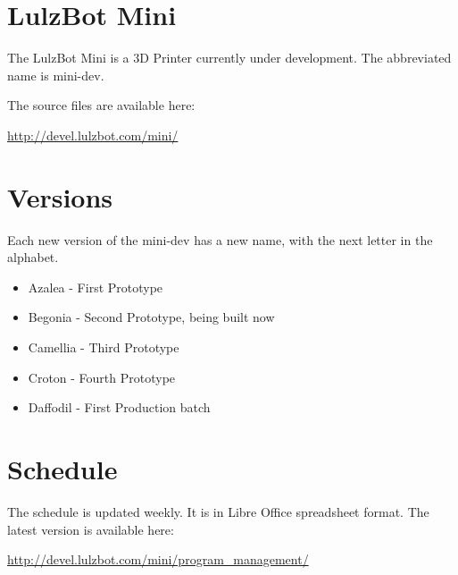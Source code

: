 %
%
%
%
%

\section{LulzBot Mini}
The LulzBot Mini is a 3D Printer currently under development. The
abbreviated name is mini-dev.

The source files are available here:

\href{http://devel.lulzbot.com/mini/}{http://devel.lulzbot.com/mini/}

\section{Versions}
Each new version of the mini-dev has a new name, with the next letter in the alphabet.

\begin{itemize}
  \item Azalea - First Prototype
  \item Begonia - Second Prototype, being built now
  \item Camellia - Third Prototype
  \item Croton - Fourth Prototype
  \item Daffodil - First Production batch
\end{itemize}

\section{Schedule}
The schedule is updated weekly. It is in Libre Office spreadsheet format. The
latest version is available here:

\url{http://devel.lulzbot.com/mini/program_management/}







